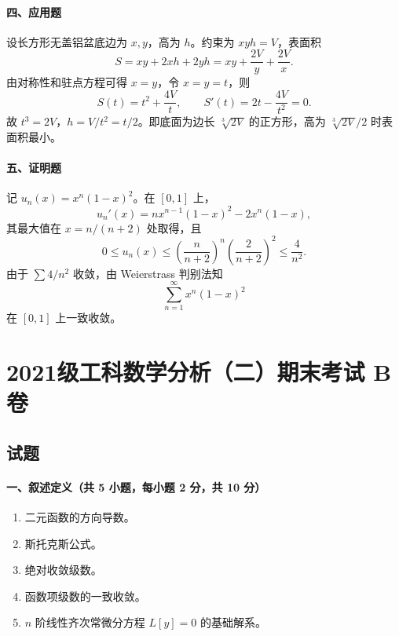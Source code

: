 \paragraph{四、应用题}
设长方形无盖铝盆底边为 $x,y$，高为 $h$。约束为 $xyh=V$，表面积
\[
  S=xy+2xh+2yh=xy+\frac{2V}{y}+\frac{2V}{x}.
\]
由对称性和驻点方程可得 $x=y$，令 $x=y=t$，则
\[
  S(t)=t^2+\frac{4V}{t},\qquad S'(t)=2t-\frac{4V}{t^2}=0.
\]
故 $t^3=2V$，$h=V/t^2=t/2$。即底面为边长 $\sqrt[3]{2V}$ 的正方形，高为 $\sqrt[3]{2V}/2$ 时表面积最小。

\paragraph{五、证明题}
记 $u_n(x)=x^n(1-x)^2$。在 $[0,1]$ 上，
\[
  u_n'(x)=nx^{n-1}(1-x)^2-2x^n(1-x),
\]
其最大值在 $x=n/(n+2)$ 处取得，且
\[
  0\le u_n(x)\le \left(\frac{n}{n+2}\right)^n\left(\frac{2}{n+2}\right)^2\le \frac{4}{n^2}.
\]
由于 $\sum 4/n^2$ 收敛，由 Weierstrass 判别法知
\[
  \sum_{n=1}^\infty x^n(1-x)^2
\]
在 $[0,1]$ 上一致收敛。

\section{2021级工科数学分析（二）期末考试 B 卷}

\subsection{试题}

\paragraph{一、叙述定义（共 5 小题，每小题 2 分，共 10 分）}
\begin{enumerate}
  \item 二元函数的方向导数。
  \item 斯托克斯公式。
  \item 绝对收敛级数。
  \item 函数项级数的一致收敛。
  \item $n$ 阶线性齐次常微分方程 $L[y]=0$ 的基础解系。
\end{enumerate}

